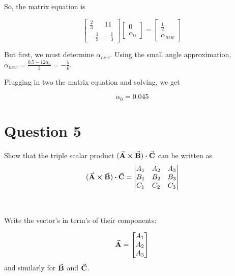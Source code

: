 \documentclass[a4paper]{article}
\begin{document}
So, the matrix equation is 

$$ \begin{bmatrix}
    \frac{2}{3} & 11\\
    - \frac{1}{9} & - \frac{1}{3}
\end{bmatrix}
\begin{bmatrix}
    0 \\
    \alpha_0
\end{bmatrix}
=
\begin{bmatrix}
    \frac{1}{2}   \\
    \alpha_{new}
\end{bmatrix}$$

But first, we must determine $\alpha_{new}$. Using the small angle approximation, $\alpha_{new} = \frac{0.5 - 12\alpha_0}{3} = -\frac{5}{6}$.

Plugging in two the matrix equation and solving, we get

$$\alpha_{0} = 0.045$$












\section*{Question 5}
Show that the triple scalar product $(\va{A} \cross \va{B}) \vdot \va{C}$ can be written as
$$ (\va{A} \cross \va{B}) \vdot \va{C} = 
    \begin{vmatrix}
    A_1 & A_2 & A_3 \\
    B_1 & B_2 & B_3 \\
    C_1 & C_2 & C_3 
    \end{vmatrix}  $$ \\\\

Write the vector's in term's of their components:

$$ \va{A} = \begin{bmatrix}
    A_1 \\
    A_2 \\
    A_3 \\
\end{bmatrix} $$
and similarly for $\va{B}$ and $\va{C}$.
\end{document}
